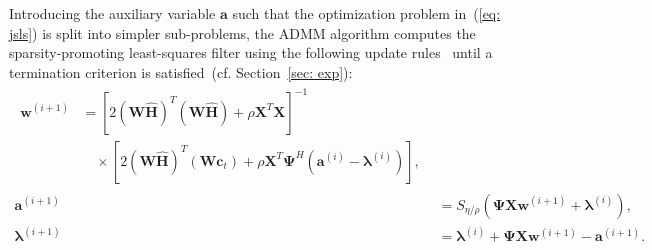 \documentclass[fleqn]{aes2e}
\begin{document}
Introducing the auxiliary variable $\mathbf{a}$ such that the optimization problem in~(\ref{eq: jsls}) is split into simpler sub-problems, the ADMM algorithm computes the sparsity-promoting least-squares filter using the following update rules~\cite{Kodrasi_ICASSP_2016,Kodrasi_ITASLP_2016b} until a termination criterion is satisfied~(cf. Section~\ref{sec: exp}):
{\footnotesize{
\begin{align}
\label{eq: w_admm_sls0}
\begin{split}
\mathbf{w}^{(i+1)} & = [ 2 (\mathbf{W}\hat{\mathbf{H}})^T(\mathbf{W}\hat{\mathbf{H}}) + \rho \mathbf{X}^T \mathbf{X} ]^{-1} \\
 &\quad \times [2 (\mathbf{W}\hat{\mathbf{H}})^T (\mathbf{W}\mathbf{c}_t) + \rho \mathbf{X}^T \bm{\Psi}^H \!({\mathbf{a}}^{(i)} - \bm{\lambda}^{(i)})],
\end{split} \\
\label{eq: aux_update}
{\mathbf{a}}^{(i+1)} & = S_{\eta / \rho}(\bm{\Psi}\mathbf{X}\mathbf{w}^{(i+1)} + \bm{\lambda}^{(i)}), \\
\label{eq: up_lambda_sls}
\bm{\lambda}^{(i+1)} & = \bm{\lambda}^{(i)} + \bm{\Psi}\mathbf{X}\mathbf{w}^{(i+1)} - {\mathbf{a}}^{(i+1)}.
\end{align}}}%
\end{document}
